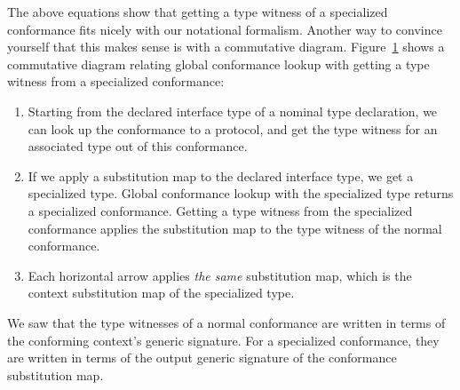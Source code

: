 \documentclass[a4paper,headsepline,bibliography=totoc,toc=flat,fleqn,twoside=semi]{scrbook}
\theoremstyle{definition}
\theoremstyle{definition}
\theoremstyle{definition}
\newcommand{\mathboxed}[1]{\boxed{\mbox{\vphantom{pI\texttt{pI}}#1}}}
\begin{document}
The above equations show that getting a type witness of a specialized conformance fits nicely with our notational formalism. Another way to convince yourself that this makes sense is with a commutative diagram. Figure~\ref{type witness diagram} shows a commutative diagram relating global conformance lookup with getting a type witness from a specialized conformance:
\begin{enumerate}
\item Starting from the declared interface type of a nominal type declaration, we can look up the conformance to a protocol, and get the type witness for an associated type out of this conformance.
\item If we apply a substitution map to the declared interface type, we get a specialized type. Global conformance lookup with the specialized type returns a specialized conformance. Getting a type witness from the specialized conformance applies the substitution map to the type witness of the normal conformance.
\item Each horizontal arrow applies \emph{the same} substitution map, which is the context substitution map of the specialized type.
\end{enumerate}
\begin{figure}\label{type witness diagram}
\begin{center}
\end{center}
\end{figure}

We saw that the type witnesses of a normal conformance are written in terms of the conforming context's generic signature. For a specialized conformance, they are written in terms of the output generic signature of the conformance substitution map.
\end{document}

